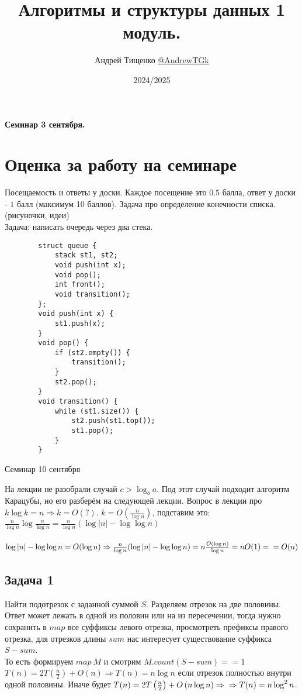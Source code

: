 \documentclass[12pt, a4paper]{article}
\title{Алгоритмы и структуры данных 1 модуль.}
\author{Андрей Тищенко \href{https://t.me/AndrewTGk}{@AndrewTGk}}
\date{2024/2025}
\begin{document}
    \maketitle
    \begin{center}
        \textbf{Семинар 3 сентября.}
    \end{center}
    \section*{Оценка за работу на семинаре}
    Посещаемость и ответы у доски. Каждое посещение это $0.5$ балла, ответ у доски - $1$ балл (максимум 10 баллов).
    Задача про определение конечности списка. (рисуночки, идеи)\\
    Задача: написать очередь через два стека.
    \begin{lstlisting}
        struct queue {
            stack st1, st2;
            void push(int x);
            void pop();
            int front();
            void transition();
        };
        void push(int x) {
            st1.push(x);
        }
        void pop() {
            if (st2.empty()) {
                transition();
            }
            st2.pop();
        }
        void transition() {
            while (st1.size()) {
                st2.push(st1.top());
                st1.pop();
            }
        }
    \end{lstlisting}
    \begin{center}
        Семинар 10 сентября
    \end{center}
    На лекции не разобрали случай $c > \log_b a$. Под этот случай подходит алгоритм Карацубы, но его 
    разберём на следующей лекции.
    Вопрос в лекции про $k\log k = n\Rightarrow k = O(?)$. $k = O\left(\frac{n}{\log n}\right)$, подставим это:\\
    $\frac{n}{\log n} \log \frac{n}{\log n} = \frac{n}{\log n}(\log |n| - \log\log n)$\\\
    $\log |n| - \log\log n = O(\log n)\Rightarrow \frac{n}{\log n}(\log |n| - \log\log n) = n\frac{O(\log n)}{\log n} = nO(1) =\\
    = O(n)$
    \subsection*{Задача 1}
    Найти подотрезок с заданной суммой $S$. Разделяем отрезок на две половины.\\
    Ответ может лежать в одной из половин или на из пересечении, тогда нужно сохранить в 
    $map$ все суффиксы левого отрезка, просмотреть префиксы правого отрезка, для отрезков длины $sum$
    нас интересует существование суффикса $S - sum$.\\
    То есть формируем $map\ M$ и смотрим $M.count(S - sum) == 1$\\
    $T(n) = 2T\left(\frac{n}{2} \right) + O\left(n\right)\Rightarrow T(n) = n\log n$ если отрезок полностью внутри одной половины.
    Иначе будет $T(n) = 2T\left(\frac{n}{2} \right) + O\left(n\log n\right)\Rightarrow\\
    \Rightarrow  T(n) = n\log^2 n$.
\end{document}
